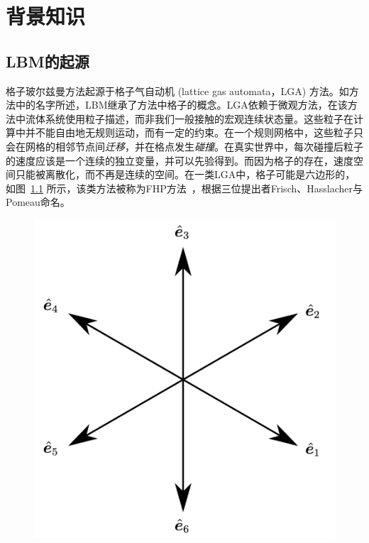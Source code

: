 \chapter{背景知识}

\section{LBM的起源}
\label{sec:2_LBM_origin}
格子玻尔兹曼方法起源于格子气自动机 (lattice gas automata，LGA) 方法。如方法中的名字所述，LBM继承了方法中格子的概念。LGA依赖于微观方法，在该方法中流体系统使用粒子描述，而非我们一般接触的宏观连续状态量。这些粒子在计算中并不能自由地无规则运动，而有一定的约束。在一个规则网格中，这些粒子只会在网格的相邻节点间\textit{迁移}，并在格点发生\textit{碰撞}。在真实世界中，每次碰撞后粒子的速度应该是一个连续的独立变量，并可以先验得到。而因为格子的存在，速度空间只能被离散化，而不再是连续的空间。在一类LGA中，格子可能是六边形的，如图~\ref{img:LGA_lattice} 所示，该类方法被称为FHP方法~\cite{frisch1986lattice}，根据三位提出者Frisch、Hasslacher与Pomeau命名。

\begin{figure}[htb]
    \centering
      \includegraphics[width=0.5\columnwidth]{figures/LGA_lattice.png}
    \label{img:LGA_lattice}
\end{figure}

